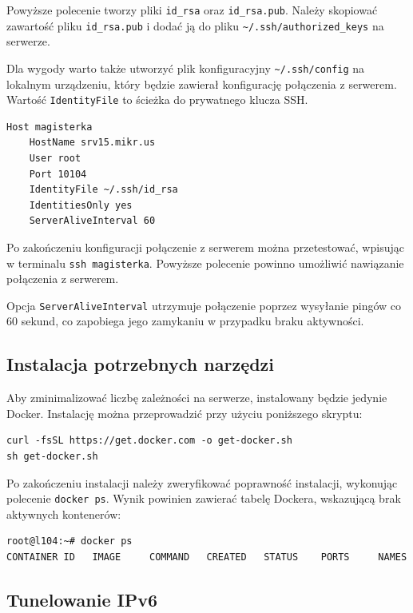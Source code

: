 \documentclass{article}
\begin{document}
Powyższe polecenie tworzy pliki \lstinline|id_rsa| oraz \lstinline|id_rsa.pub|. Należy skopiować zawartość pliku \lstinline|id_rsa.pub| i dodać ją do pliku \lstinline|~/.ssh/authorized_keys| na serwerze.

Dla wygody warto także utworzyć plik konfiguracyjny \lstinline|~/.ssh/config| na lokalnym urządzeniu, który będzie zawierał konfigurację połączenia z serwerem. Wartość \lstinline|IdentityFile| to ścieżka do prywatnego klucza SSH.

\begin{lstlisting}[caption=Przykładowa konfiguracja pliku config na lokalnej maszynie]
Host magisterka
    HostName srv15.mikr.us
    User root
    Port 10104
    IdentityFile ~/.ssh/id_rsa
    IdentitiesOnly yes
    ServerAliveInterval 60
\end{lstlisting}

Po zakończeniu konfiguracji połączenie z serwerem można przetestować, wpisując w terminalu \lstinline|ssh magisterka|. Powyższe polecenie powinno umożliwić nawiązanie połączenia z serwerem.

Opcja \lstinline|ServerAliveInterval| utrzymuje połączenie poprzez wysyłanie pingów co 60 sekund, co zapobiega jego zamykaniu w przypadku braku aktywności.

\subsection{Instalacja potrzebnych narzędzi}

Aby zminimalizować liczbę zależności na serwerze, instalowany będzie jedynie Docker. Instalację można przeprowadzić przy użyciu poniższego skryptu:

\begin{lstlisting}[caption=Skrypt instalujący dockera na maszynie Ubuntu]
curl -fsSL https://get.docker.com -o get-docker.sh
sh get-docker.sh
\end{lstlisting}

Po zakończeniu instalacji należy zweryfikować poprawność instalacji, wykonując polecenie \lstinline|docker ps|. Wynik powinien zawierać tabelę Dockera, wskazującą brak aktywnych kontenerów:

\begin{lstlisting}[caption=Wynik wykonania komendy weryfikującej instalację Dockera]
root@l104:~# docker ps
CONTAINER ID   IMAGE     COMMAND   CREATED   STATUS    PORTS     NAMES
\end{lstlisting}


\subsection{Tunelowanie IPv6}
\end{document}
